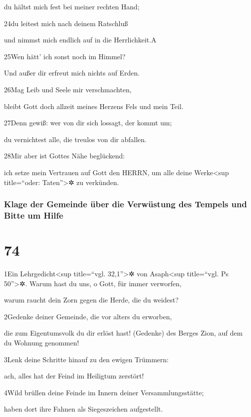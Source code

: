 du hältst mich fest bei meiner rechten Hand;

24du leitest mich nach deinem Ratschluß

und nimmst mich endlich auf in die Herrlichkeit.{A}

25Wen hätt' ich sonst noch im Himmel?

Und außer dir erfreut mich nichts auf Erden.

26Mag Leib und Seele mir verschmachten,

bleibt Gott doch allzeit meines Herzens Fels und mein Teil.

27Denn gewiß: wer von dir sich lossagt, der kommt um;

du vernichtest alle, die treulos von dir abfallen.

28Mir aber ist Gottes Nähe beglückend:

ich setze mein Vertrauen auf Gott den HERRN, um alle deine
Werke\textless sup title=``oder: Taten''\textgreater✲ zu verkünden.

\hypertarget{klage-der-gemeinde-uxfcber-die-verwuxfcstung-des-tempels-und-bitte-um-hilfe}{%
\subsubsection{Klage der Gemeinde über die Verwüstung des Tempels und
Bitte um
Hilfe}\label{klage-der-gemeinde-uxfcber-die-verwuxfcstung-des-tempels-und-bitte-um-hilfe}}

\hypertarget{section-73}{%
\section{74}\label{section-73}}

1Ein Lehrgedicht\textless sup title=``vgl. 32,1''\textgreater✲ von
Asaph\textless sup title=``vgl. Ps 50''\textgreater✲. Warum hast du uns,
o Gott, für immer verworfen,

warum raucht dein Zorn gegen die Herde, die du weidest?

2Gedenke deiner Gemeinde, die vor alters du erworben,

die zum Eigentumsvolk du dir erlöst hast! (Gedenke) des Berges Zion, auf
dem du Wohnung genommen!

3Lenk deine Schritte hinauf zu den ewigen Trümmern:

ach, alles hat der Feind im Heiligtum zerstört!

4Wild brüllen deine Feinde im Innern deiner Versammlungsstätte;

haben dort ihre Fahnen als Siegeszeichen aufgestellt.

